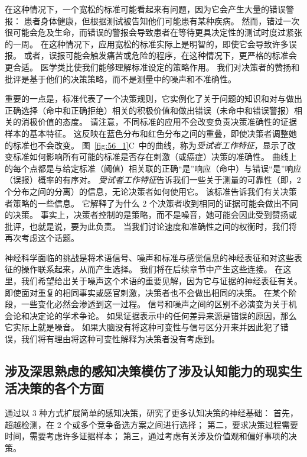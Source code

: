 在这种情况下，一个宽松的标准可能看起来有问题，因为它会产生大量的错误警报：
患者身体健康，但根据测试被告知他们可能患有某种疾病。
然而，错过一次很可能会危及生命，而错误的警报会导致患者在等待更具决定性的测试时度过紧张的一周。
在这种情况下，应用宽松的标准实际上是明智的，即使它会导致许多误报。
或者，误报可能会触发痛苦或危险的程序，在这种情况下，更严格的标准会更合适。
医学类比使我们能够理解标准设定的策略作用。
我们对决策者的赞扬和批评是基于他们的决策策略，而不是测量中的噪声和不准确性。


重要的一点是，标准代表了一个决策规则，它实例化了关于问题的知识和对与做出正确选择（命中和正确拒绝）相关的积极价值和做出错误（未命中和错误警报）相关的消极价值的态度。
请注意，不同标准的应用不会改变负责决策准确性的证据样本的基本特征。
这反映在蓝色分布和红色分布之间的重叠，即使决策者调整她的标准也不会改变。
图~\ref{fig:56_1}C~中的曲线，称为\textit{受试者工作特征}，显示了改变标准如何影响所有可能的标准是否存在刺激（或癌症）决策的准确性。
曲线上的每个点都是与给定标准（阈值）相关联的正确“是”响应（命中）与错误“是”响应（误报）概率的有序对。
\textit{受试者工作特征}告诉我们一些关于测量的可靠性（即，2 个分布之间的分离）的信息，无论决策者如何使用它。
该标准告诉我们有关决策者策略的一些信息。
它解释了为什么 2 个决策者收到相同的证据可能会做出不同的决策。
事实上，决策者控制的是策略，而不是噪音，她可能会因此受到赞扬或批评，也就是说，要为此负责。
当我们讨论速度和准确性之间的权衡时，我们将再次考虑这个话题。


神经科学面临的挑战是将术语信号、噪声和标准与感觉信息的神经表征和对这些表征的操作联系起来，从而产生选择。
我们将在后续章节中产生这些连接。
在这里，我们希望给出关于噪声这个术语的重要见解，因为它与证据的神经表征有关。
即使面对重复的相同事实或感官刺激，决策者也不会做出相同的决策。
在某个阶段，一些变化必然会渗透到这一过程。
信号和噪声之间的区别不必演变为关于机会论和决定论的学术争论。
如果证据表示中的任何差异来源是错误的原因，那么它实际上就是噪音。
如果大脑没有将这种可变性与信号区分开来并因此犯了错误，我们将有理由将这种可变性解释为决策者没有考虑到。


\subsection{涉及深思熟虑的感知决策模仿了涉及认知能力的现实生活决策的各个方面}

通过以 3 种方式扩展简单的感知决策，研究了更多认知决策的神经基础：
首先，超越检测，在 2 个或多个竞争备选方案之间进行选择；
第二，要求决策过程需要时间，需要考虑许多证据样本；
第三，通过考虑有关涉及价值观和偏好事项的决策。


